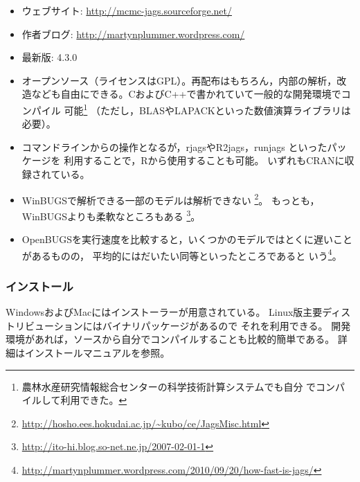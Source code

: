 \documentclass[11pt,uplatex]{jsarticle}
\begin{document}
\begin{itemize}

\item ウェブサイト:
  \url{http://mcmc-jags.sourceforge.net/}
  
\item 作者ブログ:
  \url{http://martynplummer.wordpress.com/}  

\item 最新版: 4.3.0

\item オープンソース（ライセンスはGPL）。再配布はもちろん，内部の解析，改
  造なども自由にできる。CおよびC++で書かれていて一般的な開発環境でコンパイル
  可能\footnote{農林水産研究情報総合センターの科学技術計算システムでも自分
  でコンパイルして利用できた。}
  （ただし，BLASやLAPACKといった数値演算ライブラリは必要）。

\item コマンドラインからの操作となるが，\textsf{rjags}や\textsf{R2jags}，\textsf{runjags}
といったパッケージを
利用することで，\textsf{R}から使用することも可能。
いずれもCRANに収録されている。

\item \textsf{WinBUGS}で解析できる一部のモデルは解析できない
  \footnote{\url{http://hosho.ees.hokudai.ac.jp/~kubo/ce/JagsMisc.html}}。
 もっとも，\textsf{WinBUGS}よりも柔軟なところもある
  \footnote{\url{http://ito-hi.blog.so-net.ne.jp/2007-02-01-1}}。
  
\item \textsf{OpenBUGS}を実行速度を比較すると，いくつかのモデルではとくに遅いことがあるものの，
平均的にはだいたい同等といったところであると
いう\footnote{\url{http://martynplummer.wordpress.com/2010/09/20/how-fast-is-jags/}}。

\end{itemize}

\subsubsection*{インストール}
WindowsおよびMacにはインストーラーが用意されている。
Linux版主要ディストリビューションにはバイナリパッケージがあるので
それを利用できる。
開発環境があれば，ソースから自分でコンパイルすることも比較的簡単である。
詳細はインストールマニュアルを参照。

\end{document}
